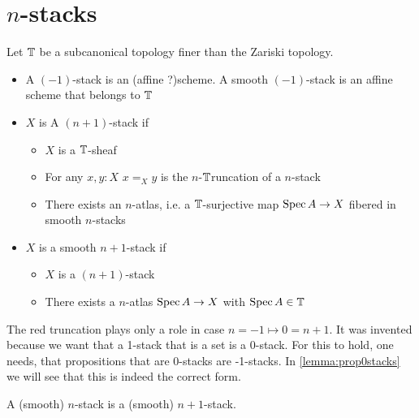 \documentclass{article}
\newcommand{\affineA}{(affine ?)}
\newcommand{\red}[1]{{\color{red} #1}}
\begin{document}
\section{ $n$-stacks}

\begin{definition}
Let $\mathbb{T}$ be a subcanonical topology finer than the Zariski topology.
    \begin{itemize}
        
    
        \item A  $(-1)$-stack is an \affineA scheme. A smooth $(-1)$-stack is an affine scheme that belongs to $\mathbb{T}$\\
        
        \item $X$ is A  $(n+1)$-stack if 
        \begin{itemize}
            \item $X$ is a $\mathbb{T}$-sheaf
            \item For any $x , y : X$ $x =_X y$ is \red{the $n$-$\mathbb{T}$runcation of} a  $n$-stack
            \item There exists an $n$-atlas, i.e. a $\mathbb{T}$-surjective map $\operatorname{Spec} A \to X$ fibered in smooth $n$-stacks
        \end{itemize}
        \item $X$ is a smooth $n+1$-stack if
        \begin{itemize}
            \item $X$ is a  $(n+1)$-stack
            \item There exists a $n$-atlas $\operatorname{Spec} A \to X$ with $\operatorname{Spec} A \in \mathbb{T}$
        \end{itemize}
    \end{itemize}
    
\end{definition}

\begin{rmk}
    \red{The red truncation plays only a role in case $n=-1 \mapsto 0 = n+1$.
    }
    It was invented because we want that a  1-stack that is a set is a  0-stack. For this to hold, one needs, that propositions that are  0-stacks are  -1-stacks. In \ref{lemma:prop0stacks} we will see that this is indeed the correct form.
\end{rmk}
\begin{lemma}{\label{lemma:succStab}}
    A  (smooth) $n$-stack is a  (smooth) $n+1$-stack.
\end{lemma}
\end{document}
